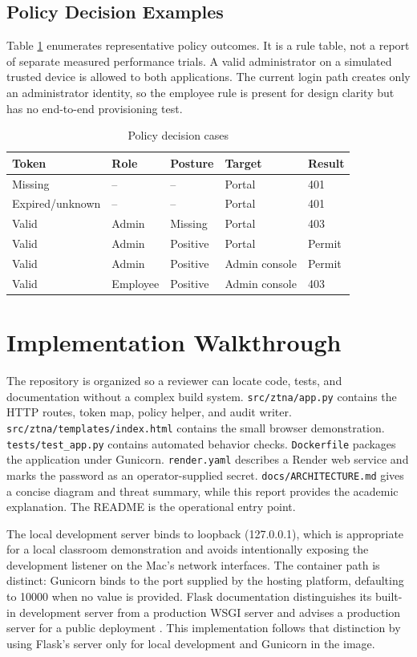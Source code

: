 \subsection{Policy Decision Examples}
Table \ref{tab:decisions} enumerates representative policy outcomes. It is a rule table, not a report of separate measured performance trials. A valid administrator on a simulated trusted device is allowed to both applications. The current login path creates only an administrator identity, so the employee rule is present for design clarity but has no end-to-end provisioning test.
\begin{table}[ht]
\caption{Policy decision cases}
\label{tab:decisions}
\centering
\begin{tabular}{lllll}
\toprule
Token & Role & Posture & Target & Result\\
\midrule
Missing & -- & -- & Portal & 401\\
Expired/unknown & -- & -- & Portal & 401\\
Valid & Admin & Missing & Portal & 403\\
Valid & Admin & Positive & Portal & Permit\\
Valid & Admin & Positive & Admin console & Permit\\
Valid & Employee & Positive & Admin console & 403\\
\bottomrule
\end{tabular}
\end{table}

\section{Implementation Walkthrough}
The repository is organized so a reviewer can locate code, tests, and documentation without a complex build system. \texttt{src/ztna/app.py} contains the HTTP routes, token map, policy helper, and audit writer. \texttt{src/ztna/templates/index.html} contains the small browser demonstration. \texttt{tests/test\_app.py} contains automated behavior checks. \texttt{Dockerfile} packages the application under Gunicorn. \texttt{render.yaml} describes a Render web service and marks the password as an operator-supplied secret. \texttt{docs/ARCHITECTURE.md} gives a concise diagram and threat summary, while this report provides the academic explanation. The README is the operational entry point.

The local development server binds to loopback (127.0.0.1), which is appropriate for a local classroom demonstration and avoids intentionally exposing the development listener on the Mac's network interfaces. The container path is distinct: Gunicorn binds to the port supplied by the hosting platform, defaulting to 10000 when no value is provided. Flask documentation distinguishes its built-in development server from a production WSGI server and advises a production server for a public deployment \cite{flaskDeploy}. This implementation follows that distinction by using Flask's server only for local development and Gunicorn in the image.


